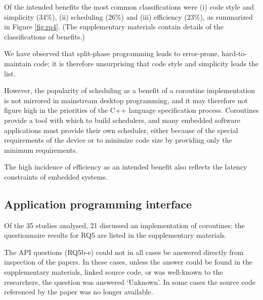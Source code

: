\documentclass[format=acmsmall, review=false, screen=false]{acmart}
\begin{document}
Of the intended benefits the most common classifications were (i) code style and simplicity (34\%), (ii) scheduling (26\%) and (iii) efficiency (23\%), as summarized in Figure \ref{fig:rq4}. (The supplementary materials contain details of the classifications of benefits.)

We have observed that split-phase programming leads to error-prone, hard-to-maintain code; it is therefore unsurprising that code style and simplicity leads the list.

However, the popularity of scheduling as a benefit of a coroutine implementation is not mirrored in mainstream desktop programming, and it may therefore not figure high in the priorities of the C++ language specification process. Coroutines provide a tool with which to build schedulers, and many embedded software applications must provide their own scheduler, either because of the special requirements of the device \cite{Inam2011, Park2015, Susilo2009} or to minimize code size by providing only the minimum requirements.

The high incidence of efficiency as an intended benefit also reflects the latency constraints of embedded systems.

\subsection{Application programming interface}

Of the 35 studies analysed, 21 discussed an implementation of coroutines: the questionnaire results for RQ5 are listed in the supplementary materials.

The API questions (RQ5b-e) could not in all cases be answered directly from inspection of the papers. In these cases, unless the answer could be found in the supplementary materials, linked source code, or was well-known to the researchers, the question was answered ‘Unknown’. In some cases the source code referenced by the paper was no longer available.
\end{document}
